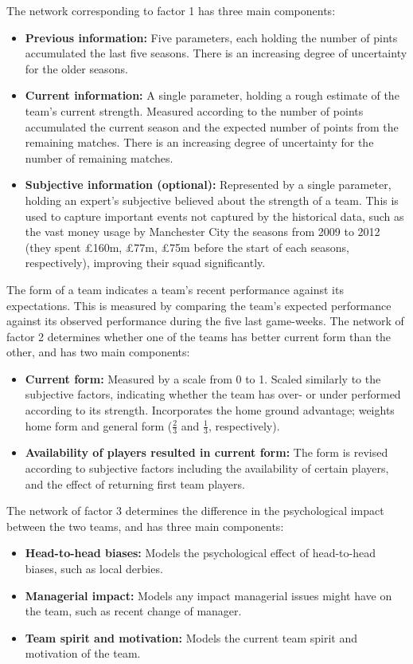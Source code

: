 The network corresponding to factor 1 has three main components:
\begin{itemize}
    \item \textbf{Previous information:} Five parameters, each holding the number of pints accumulated the last five seasons. There is an increasing degree of uncertainty for the older seasons.
    \item \textbf{Current information:} A single parameter, holding a rough estimate of the team's current strength. Measured according to the number of points accumulated the current season and the expected number of points from the remaining matches. There is an increasing degree of uncertainty for the number of remaining matches.
    \item \textbf{Subjective information (optional):} Represented by a single parameter, holding an expert's subjective believed about the strength of a team. This is used to capture important events not captured by the historical data, such as the vast money usage by Manchester City the seasons from 2009 to 2012 (they spent £160m, £77m, £75m before the start of each seasons, respectively), improving their squad significantly.
\end{itemize}

The form of a team indicates a team's recent performance against its expectations. This is measured by comparing the team's expected performance against its observed performance during the five last game-weeks. The network of factor 2 determines whether one of the teams has better current form than the other, and has two main components:
\begin{itemize}
    \item \textbf{Current form:} Measured by a scale from 0 to 1. Scaled similarly to the subjective factors, indicating whether the team has over- or under performed according to its strength. Incorporates the home ground advantage; weights home form and general form ($\frac{2}{3}$ and $\frac{1}{3}$, respectively).
    \item \textbf{Availability of players resulted in current form:} The form is revised according to subjective factors including the availability of certain players, and the effect of returning first team players.
\end{itemize}

The network of factor 3 determines the difference in the psychological impact between the two teams, and has three main components:
\begin{itemize}
    \item \textbf{Head-to-head biases:} Models the psychological effect of head-to-head biases, such as local derbies.
    \item \textbf{Managerial impact:} Models any impact managerial issues might have on the team, such as recent change of manager.
    \item \textbf{Team spirit and motivation:} Models the current team spirit and motivation of the team.
\end{itemize}

